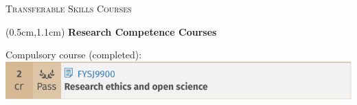 \documentclass[9pt]{beamer}
\begin{document}
\begin{frame}{\textsc{Transferable Skills Courses}}
    \begin{textblock*}{12cm}(0.5cm,1.1cm)
    {\Large \textbullet \textbf{Research Competence Courses}}

    Compulsory course (completed):
    {\centering\includegraphics[scale=0.75]{ethics.pdf}}



     \begin{center}
    \end{center}

    \end{textblock*}    
\end{frame}
\end{document}
